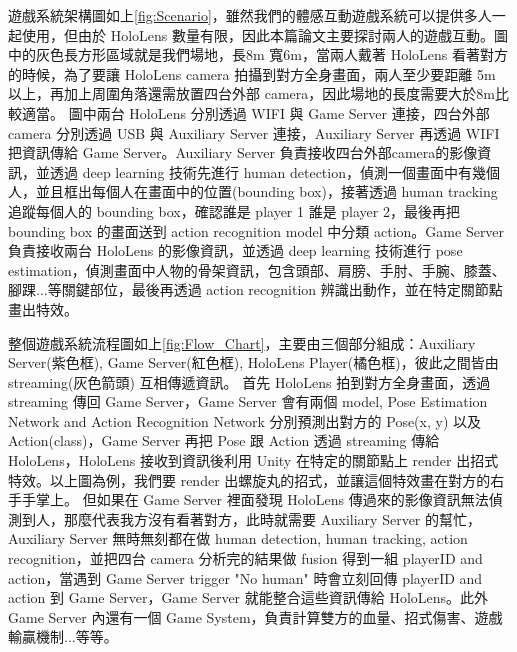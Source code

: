 


遊戲系統架構圖如上\ref{fig:Scenario}，雖然我們的體感互動遊戲系統可以提供多人一起使用，但由於 HoloLens 數量有限，因此本篇論文主要探討兩人的遊戲互動。圖中的灰色長方形區域就是我們場地，長8m 寬6m，當兩人戴著 HoloLens 看著對方的時候，為了要讓 HoloLens camera 拍攝到對方全身畫面，兩人至少要距離 5m 以上，再加上周圍角落還需放置四台外部 camera，因此場地的長度需要大於8m比較適當。
圖中兩台 HoloLens 分別透過 WIFI 與 Game Server 連接，四台外部 camera 分別透過 USB 與 Auxiliary Server 連接，Auxiliary Server 再透過 WIFI 把資訊傳給 Game Server。Auxiliary Server 負責接收四台外部camera的影像資訊，並透過 deep learning 技術先進行 human detection，偵測一個畫面中有幾個人，並且框出每個人在畫面中的位置(bounding box)，接著透過 human tracking 追蹤每個人的 bounding box，確認誰是 player 1 誰是 player 2，最後再把 bounding box 的畫面送到 action recognition model 中分類 action。Game Server 負責接收兩台 HoloLens 的影像資訊，並透過 deep learning 技術進行 pose estimation，偵測畫面中人物的骨架資訊，包含頭部、肩膀、手肘、手腕、膝蓋、腳踝...等關鍵部位，最後再透過 action recognition 辨識出動作，並在特定關節點畫出特效。


整個遊戲系統流程圖如上\ref{fig:Flow_Chart}，主要由三個部分組成：Auxiliary Server(紫色框), Game Server(紅色框), HoloLens Player(橘色框)，彼此之間皆由 streaming(灰色箭頭) 互相傳遞資訊。
首先 HoloLens 拍到對方全身畫面，透過 streaming 傳回 Game Server，Game Server 會有兩個 model, Pose Estimation Network and Action Recognition Network 分別預測出對方的 Pose(x, y) 以及 Action(class)，Game Server 再把 Pose 跟 Action 透過 streaming 傳給 HoloLens，HoloLens 接收到資訊後利用 Unity 在特定的關節點上 render 出招式特效。以上圖為例，我們要 render 出螺旋丸的招式，並讓這個特效畫在對方的右手手掌上。
但如果在 Game Server 裡面發現 HoloLens 傳過來的影像資訊無法偵測到人，那麼代表我方沒有看著對方，此時就需要 Auxiliary Server 的幫忙，Auxiliary Server 無時無刻都在做 human detection, human tracking, action recognition，並把四台 camera 分析完的結果做 fusion 得到一組 playerID and action，當遇到 Game Server trigger "No human" 時會立刻回傳 playerID and action 到 Game Server，Game Server 就能整合這些資訊傳給 HoloLens。此外 Game Server 內還有一個 Game System，負責計算雙方的血量、招式傷害、遊戲輸贏機制...等等。

